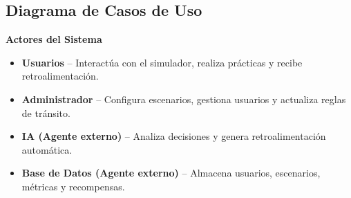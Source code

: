 \documentclass[12pt]{article}
\begin{document}
\subsection{Diagrama de Casos de Uso}

\noindent
\textbf{Actores del Sistema}
\begin{itemize}
    \item \textbf{Usuarios} – Interactúa con el simulador, realiza prácticas y recibe retroalimentación.
    \item \textbf{Administrador} – Configura escenarios, gestiona usuarios y actualiza reglas de tránsito.
    \item \textbf{IA (Agente externo)} – Analiza decisiones y genera retroalimentación automática.
    \item \textbf{Base de Datos (Agente externo)} – Almacena usuarios, escenarios, métricas y recompensas.
\end{itemize}
\end{document}
